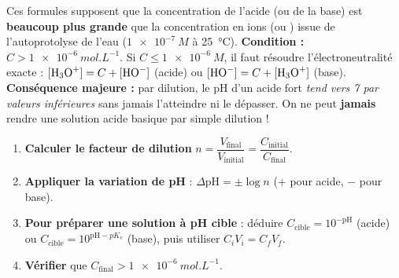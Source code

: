 \documentclass[11pt]{article}
\begin{document}
\begin{attention}[Limites de validité de la formule $\text{pH} = -\log C$ (ou $pK_e + \log C$)]
Ces formules supposent que la concentration de l'acide (ou de la base) est \textbf{beaucoup plus grande} que la concentration en ions  (ou ) issue de l'autoprotolyse de l'eau ($\SI{1e-7}{M}$ à \SI{25}{\celsius}).
\textbf{Condition :} $C > \SI{1e-6}{mol.L^{-1}}$.
Si $C \le \SI{1e-6}{M}$, il faut résoudre l'électroneutralité exacte : $[\ce{H3O+}] = C + [\ce{HO-}]$ (acide) ou $[\ce{HO-}] = C + [\ce{H3O+}]$ (base).
\textbf{Conséquence majeure :} par dilution, le pH d'un acide fort \emph{tend vers 7 par valeurs inférieures} sans jamais l'atteindre ni le dépasser. On ne peut \textbf{jamais} rendre une solution acide basique par simple dilution !
\end{attention}

\begin{methode}
\begin{enumerate}
\item \textbf{Calculer le facteur de dilution} $n = \dfrac{V_{\text{final}}}{V_{\text{initial}}} = \dfrac{C_{\text{initial}}}{C_{\text{final}}}$.
\item \textbf{Appliquer la variation de pH} : $\Delta\text{pH} = \pm \log n$ ($+$ pour acide, $-$ pour base).
\item \textbf{Pour préparer une solution à pH cible} : déduire $C_{\text{cible}} = 10^{-\text{pH}}$ (acide) ou $C_{\text{cible}} = 10^{\text{pH}-pK_e}$ (base), puis utiliser $C_i V_i = C_f V_f$.
\item \textbf{Vérifier} que $C_{\text{final}} > \SI{1e-6}{mol.L^{-1}}$.
\end{enumerate}
\end{methode}
\end{document}
